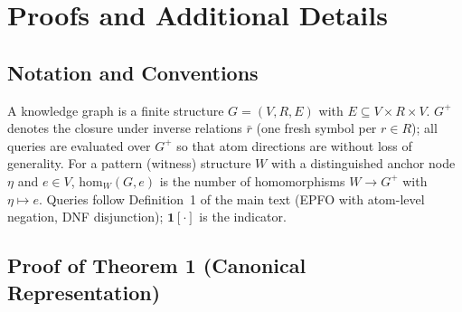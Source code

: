 \documentclass[journal]{IEEEtran}
\newcommand{\homc}{\mathrm{hom}}
\begin{document}
\appendix
\section*{Proofs and Additional Details}

\subsection*{Notation and Conventions}

A knowledge graph is a finite structure $G=(V,R,E)$ with
$E\subseteq V\times R\times V$. $G^{+}$ denotes the closure under inverse
relations $\bar r$ (one fresh symbol per $r\in R$); all queries are
evaluated over $G^{+}$ so that atom directions are without loss of
generality. For a pattern (witness) structure $W$ with a distinguished
anchor node $\eta$ and $e\in V$, $\homc_W(G,e)$ is the number of
homomorphisms $W\to G^{+}$ with $\eta\mapsto e$. Queries follow
Definition~1 of the main text (EPFO with atom-level negation, DNF
disjunction); $\mathbf 1[\cdot]$ is the indicator.

\subsection*{Proof of Theorem 1 (Canonical Representation)}
\end{document}
